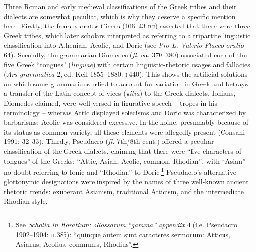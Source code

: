 \documentclass[12pt]{article}
\newcommand\textstylehigh[1]{#1}
\newenvironment{styleStandard}{\renewcommand\baselinestretch{1.25}\setlength\leftskip{0in}\setlength\rightskip{0in}\setlength\parindent{0.1972in}\setlength\parfillskip{0pt plus 1fil}\setlength\parskip{0in plus 1pt}\writerlistparindent\writerlistleftskip\leavevmode\normalfont\normalsize\writerlistlabel\ignorespaces}{\unskip\vspace{0in plus 1pt}\par}
\newcommand\writerlistleftskip{}
\newcommand\writerlistparindent{}
\newcommand\writerlistlabel{}
\begin{document}
\begin{styleStandard}
Three Roman and early medieval classifications of the Greek tribes and their dialects are somewhat peculiar, which is why they deserve a specific mention here. Firstly, the famous orator Cicero (106–43 \textsc{bc}) asserted that there were three Greek tribes, which later scholars interpreted as referring to a tripartite linguistic classification into Athenian, Aeolic, and Doric (see \textit{Pro L. Valerio Flacco oratio} 64). Secondly, the grammarian Diomedes (\textit{fl. }ca. 370–380) associated each of the five Greek “tongues” (\textit{linguae}) with certain linguistic-rhetoric usages and fallacies (\textit{Ars grammatica} 2, ed. Keil 1855–1880: \textsc{i}.440). This shows the artificial solutions on which some grammarians relied to account for variation in Greek and betrays a transfer of the Latin concept of vices (\textit{uitia}) to the Greek dialects. Ionians, Diomedes claimed, were well-versed in figurative speech – tropes in his terminology – whereas Attic displayed solecisms and Doric was characterized by barbarisms; Aeolic was considered excessive. In the koine, presumably because of its status as common variety, all these elements were allegedly present (Consani 1991: 32–33). Thirdly, Pseudacro (\textit{fl.} 7th/8th cent.) offered a peculiar classification of the Greek dialects, claiming that there were “five characters of tongues” of the Greeks: “Attic, Asian, Aeolic, common, Rhodian”, with “Asian” no doubt referring to Ionic and “Rhodian” to Doric.\footnote{\textrm{ See }\textrm{\textit{Scholia in Horatium: Glossarum “gamma” appendix}}\textrm{ 4 (i.e. Pseudacro 1902–1904: }\textrm{\textsc{ii.}}\textrm{385): “}\textstylehigh{quinque }autem sunt \textstylehigh{caracteres sermonum: }Atticus, Asianus, Aeolius, communis, Rhodius\textrm{”.}} Pseudacro’s alternative glottonymic designations were inspired by the names of three well-known ancient rhetoric trends: exuberant Asianism, traditional Atticism, and the intermediate Rhodian style.
\end{styleStandard}
\end{document}
